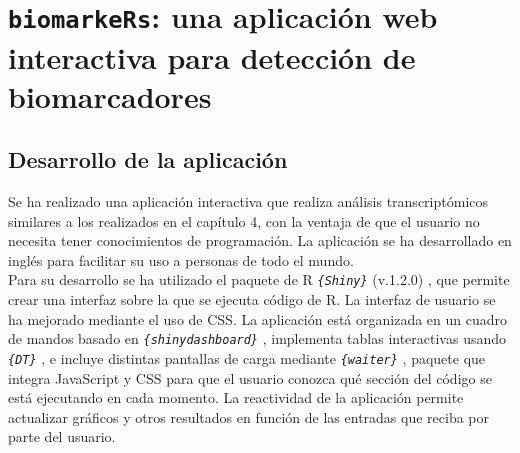 \chapter{\texttt{biomarkeRs}: una aplicación web interactiva para detección de biomarcadores}

\section{Desarrollo de la aplicación}

Se ha realizado una aplicación interactiva que realiza análisis transcriptómicos similares a los realizados en el capítulo 4, con la ventaja de que el usuario no necesita tener conocimientos de programación. La aplicación se ha desarrollado en inglés para facilitar su uso a personas de todo el mundo.\\

Para su desarrollo se ha utilizado el paquete de R \textit{\texttt{\{Shiny\}}} (v.1.2.0) \cite{Chang2020}, que permite crear una interfaz sobre la que se ejecuta código de R. La interfaz de usuario se ha mejorado mediante el uso de CSS. La aplicación está organizada en un cuadro de mandos basado en \textit{\texttt{\{shinydashboard\}}} \cite{Chang2018}, implementa tablas interactivas usando \textit{\texttt{\{DT\}}} \cite{Xie2020}, e incluye distintas pantallas de carga mediante \textit{\texttt{\{waiter\}}} \cite{Coene2020}, paquete que integra JavaScript y CSS para que el usuario conozca qué sección del código se está ejecutando en cada momento. La reactividad de la aplicación permite actualizar gráficos y otros resultados en función de las entradas que reciba por parte del usuario. \\

